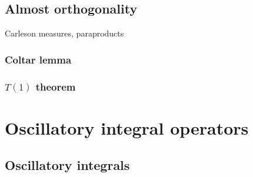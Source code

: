 \documentclass{../../large}
\begin{document}
\chapter{Almost orthogonality}
Carleson measures, paraproducts
\section{Coltar lemma}
\section{$T(1)$ theorem}




\part{Oscillatory integral operators}


\chapter{Oscillatory integrals}
\end{document}
